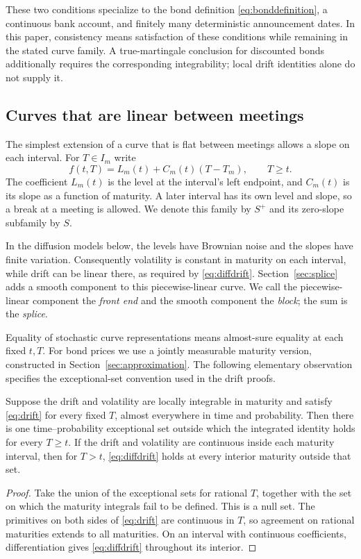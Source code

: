 These two conditions specialize \citet[Theorem 3.5 and Remark 3.9]{fontana2022term} to the bond definition \eqref{eq:bonddefinition}, a continuous bank account, and finitely many deterministic announcement dates. In this paper, consistency means satisfaction of these conditions while remaining in the stated curve family. A true-martingale conclusion for discounted bonds additionally requires the corresponding integrability; local drift identities alone do not supply it.

\subsection{Curves that are linear between meetings}
The simplest extension of a curve that is flat between meetings allows a slope on each interval. For $T\in I_m$ write
\begin{equation}
f(t,T)=L_m(t)+C_m(t)(T-T_m),\qquad T\ge t.
\label{eq:front}
\end{equation}
The coefficient $L_m(t)$ is the level at the interval's left endpoint, and $C_m(t)$ is its slope as a function of maturity. A later interval has its own level and slope, so a break at a meeting is allowed. We denote this family by $S^+$ and its zero-slope subfamily by $S$.

In the diffusion models below, the levels have Brownian noise and the slopes have finite variation. Consequently volatility is constant in maturity on each interval, while drift can be linear there, as required by \eqref{eq:diffdrift}. Section~\ref{sec:splice} adds a smooth component to this piecewise-linear curve. We call the piecewise-linear component the \emph{front end} and the smooth component the \emph{block}; the sum is the \emph{splice}.

Equality of stochastic curve representations means almost-sure equality at each fixed $t,T$. For bond prices we use a jointly measurable maturity version, constructed in Section~\ref{sec:approximation}. The following elementary observation specifies the exceptional-set convention used in the drift proofs.

\begin{lemma}\label{lem:maturitynull}
Suppose the drift and volatility are locally integrable in maturity and satisfy \eqref{eq:drift} for every fixed $T$, almost everywhere in time and probability. Then there is one time--probability exceptional set outside which the integrated identity holds for every $T\ge t$. If the drift and volatility are continuous inside each maturity interval, then for $T>t$, \eqref{eq:diffdrift} holds at every interior maturity outside that set.
\end{lemma}
\begin{proof}
Take the union of the exceptional sets for rational $T$, together with the set on which the maturity integrals fail to be defined. This is a null set. The primitives on both sides of \eqref{eq:drift} are continuous in $T$, so agreement on rational maturities extends to all maturities. On an interval with continuous coefficients, differentiation gives \eqref{eq:diffdrift} throughout its interior.
\end{proof}
